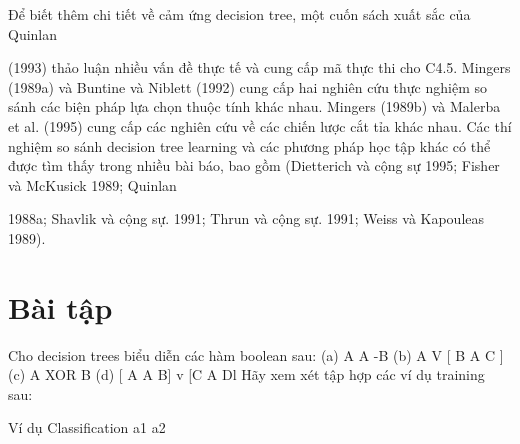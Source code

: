 Để biết thêm chi tiết về cảm ứng decision tree, một cuốn sách xuất sắc của Quinlan

(1993) thảo luận nhiều vấn đề thực tế và cung cấp mã thực thi cho C4.5. Mingers (1989a) và Buntine và Niblett (1992) cung cấp hai nghiên cứu thực nghiệm so sánh các biện pháp lựa chọn thuộc tính khác nhau. Mingers (1989b) và Malerba et al. (1995) cung cấp các nghiên cứu về các chiến lược cắt tỉa khác nhau. Các thí nghiệm so sánh decision tree learning và các phương pháp học tập khác có thể được tìm thấy trong nhiều bài báo, bao gồm (Dietterich và cộng sự 1995; Fisher và McKusick 1989; Quinlan

1988a; Shavlik và cộng sự. 1991; Thrun và cộng sự. 1991; Weiss và Kapouleas 1989).

\section{Bài tập}

Cho decision trees biểu diễn các hàm boolean sau: (a) A A -B (b) A V [ B A C ] (c) A XOR B (d) [ A A B] v [C A Dl Hãy xem xét tập hợp các ví dụ training sau:

Ví dụ Classification a1 a2

